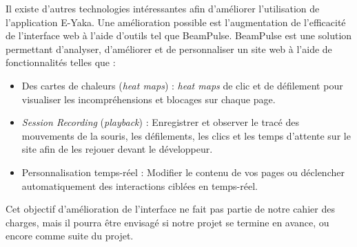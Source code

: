             Il existe d'autres technologies intéressantes afin d'améliorer l'utilisation de l'application E-Yaka. Une  amélioration possible est l'augmentation de l'efficacité de l'interface web à l'aide d'outils tel que BeamPulse. BeamPulse est une solution permettant d'analyser, d'améliorer et de personnaliser un site web à l'aide de fonctionnalités telles que :
            \begin{itemize}
                \item Des cartes de chaleurs (\emph{heat maps}) : \emph{heat maps} de clic et de défilement pour visualiser les incompréhensions et blocages sur chaque page.
                \item \emph{Session Recording} (\emph{playback}) : Enregistrer et observer le tracé des mouvements de la souris, les défilements, les clics et les temps d'attente sur le site afin de les rejouer devant le développeur.
                \item Personnalisation temps-réel : Modifier le contenu de vos pages ou déclencher automatiquement des interactions ciblées en temps-réel.
            \end{itemize}
            
            Cet objectif d'amélioration de l'interface ne fait pas partie de notre cahier des charges, mais il pourra être envisagé si notre projet se termine en avance, ou encore comme suite du projet.
        